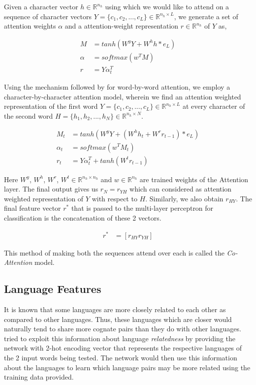 \documentclass[11pt,letterpaper]{article}
\begin{document}
Given a character vector $h \in  \mathbb{R}^{n_h}$ using which we would like to attend on a sequence of character vectors $Y = \{c_1, c_2, ..., c_L\} \in \mathbb{R}^{n_h \times L}$, we generate a set of attention weights $\alpha$ and a attention-weight representation $r \in  \mathbb{R}^{n_h}$ of $Y$ as,

\begin{align}
M &= tanh(W^yY + W^hh*e_L) \\
\alpha &= softmax(w^TM) \\
r &= Y\alpha_t^T
\end{align}

Using the mechanism followed by \citet{rocktaschel2016reasoning} for word-by-word attention, we employ a character-by-character attention model, wherein we find an attention weighted representation of the first word $Y = \{c_1, c_2, ..., c_L\} \in \mathbb{R}^{n_h \times L}$ at every character of the second word $H = \{h_1, h_2, ..., h_N\} \in \mathbb{R}^{n_h \times N}$.

\begin{align}
M_t &= tanh(W^yY + (W^hh_t + W^rr_{t-1})*e_L) \\
\alpha_t &= softmax(w^TM_t) \\
r_t &= Y\alpha_t^T + tanh(W^tr_{t-1})
\end{align}

Here $W^y$, $W^h$, $W^r$, $W^t \in  \mathbb{R}^{n_h \times n_h}$ and $w \in \mathbb{R}^{n_h}$ are trained weights of the Attention layer. The final output gives us $r_N = r_{YH}$ which can considered as attention weighted representation of $Y$ with respect to $H$. Similarly, we also obtain $r_{HY}$. The final feature vector $r^*$ that is passed to the multi-layer perceptron for classification is the concatenation of these 2 vectors.

\begin{align}
r^* &= [r_{HY} r_{YH}]
\end{align}

 This method of making both the sequences attend over each is called the \textit{Co-Attention} model.
 
\subsection{Language Features}

It is known that some languages are more closely related to each other as compared to other languages. Thus, these languages which are closer would naturally tend to share more cognate pairs than they do with other languages. \citet{rama2016siamese} tried to exploit this information about language \textit{relatedness} by providing the network with 2-hot encoding vector that represents the respective languages of the 2 input words being tested. The network would then use this information about the languages to learn which language pairs may be more related using the training data provided.
\end{document}
